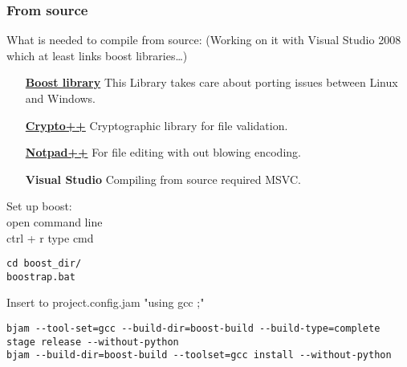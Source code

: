 \subsubsection{From source}
What is needed to compile from source: (Working on it with Visual Studio 2008 which at least links boost libraries\ldots)
\begin{itemize}
\item [ \href{http://sourceforge.net/projects/boost/files/boost/1.44.0/boost_1_44_0.7z/download}{\textbf{Boost library}} ] This Library takes care about porting issues between Linux and Windows.
\item [ \href{http://www.cryptopp.com/}{\textbf{Crypto++}} ] Cryptographic library for file validation.
\item [ \href{http://notepad-plus-plus.org/}{\textbf{Notpad++}} ] For file editing with out blowing encoding.
\item [ \textbf{Visual Studio} ] Compiling from source required MSVC.
\end{itemize}

Set up boost:\\
open command line\\
ctrl + r type cmd
\begin{verbatim} 
cd boost_dir/
boostrap.bat
\end{verbatim}
Insert to project.config.jam "using gcc ;"
\begin{verbatim} 
bjam --tool-set=gcc --build-dir=boost-build --build-type=complete stage release --without-python
bjam --build-dir=boost-build --toolset=gcc install --without-python
\end{verbatim}

